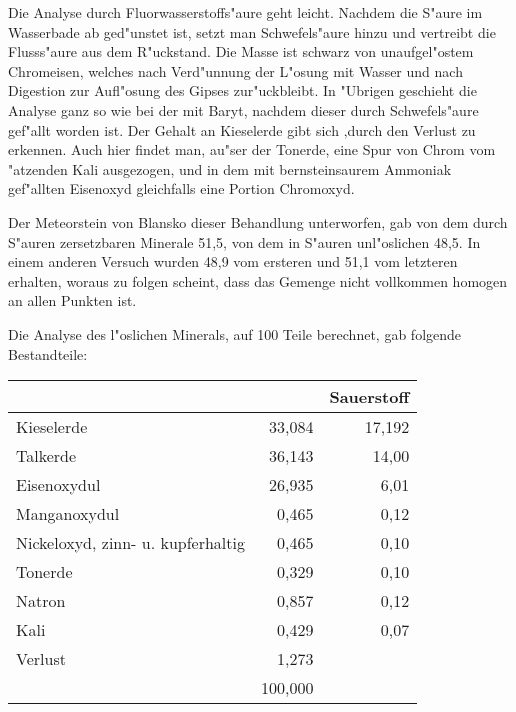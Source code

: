\documentclass[a4paper, 11pt, oneside]{article}
\begin{document}
Die Analyse durch Fluorwasserstoffs"aure geht leicht. Nachdem die S"aure im Wasserbade ab ged"unstet ist, setzt man Schwefels"aure hinzu und vertreibt die Flusss"aure aus dem R"uckstand. Die Masse ist schwarz von unaufgel"ostem Chromeisen, welches nach Verd"unnung der L"osung mit Wasser und nach Digestion zur Aufl"osung des Gipses zur"uckbleibt. In "Ubrigen geschieht die Analyse ganz so wie bei der mit Baryt, nachdem dieser durch Schwefels"aure gef"allt worden ist. Der Gehalt an Kieselerde gibt sich ‚durch den Verlust zu erkennen. Auch hier findet man, au"ser der Tonerde, eine Spur von Chrom vom "atzenden Kali ausgezogen, und in dem mit bernsteinsaurem Ammoniak gef"allten Eisenoxyd gleichfalls eine Portion Chromoxyd.

Der Meteorstein von Blansko dieser Behandlung unterworfen, gab von dem durch S"auren zersetzbaren Minerale 51,5, von dem in S"auren unl"oslichen 48,5. In einem anderen Versuch wurden 48,9 vom ersteren und 51,1 vom letzteren erhalten, woraus zu folgen scheint, dass das Gemenge nicht vollkommen homogen an allen Punkten ist.

Die Analyse des l"oslichen Minerals, auf 100 Teile berechnet, gab folgende Bestandteile:
\begin{center}
\begin{tabular}{ |l|r|r| }
    \hline
     & & Sauerstoff\\\hline
    Kieselerde & 33,084 & 17,192\\\hline
    Talkerde & 36,143 & 14,00\\\hline
    Eisenoxydul & 26,935 & 6,01\\\hline
    Manganoxydul & 0,465 & 0,12\\\hline
    Nickeloxyd, zinn- u. kupferhaltig & 0,465 & 0,10\\\hline
    Tonerde & 0,329 & 0,10\\\hline
    Natron & 0,857 & 0,12\\\hline
    Kali & 0,429 & 0,07\\\hline
    Verlust & 1,273 & \\\hline
     & 100,000 & \\
    \hline
\end{tabular}
\end{center}
\end{document}
